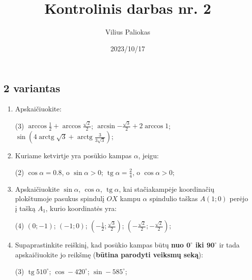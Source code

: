 \documentclass[a4paper]{article}
\title{Kontrolinis darbas nr. 2}
\author{Vilius Paliokas}
\date{2023/10/17}
\DeclareMathOperator{\tg}{tg}
\DeclareMathOperator{\arctg}{arctg}
\begin{document}
\thispagestyle{empty}
\subsection*{2 variantas}

\begin{enumerate}
      \item Apskaičiuokite:

            \begin{tasks}[item-format={\normalfont}, after-item-skip=4mm](3)
                  \task $\arccos{\frac{1}{2}} + \arccos{\frac{\sqrt{2}}{2}} $;
                  \task $\arcsin{-\frac{\sqrt{3}}{2}} + 2\arccos{1} $;
                  \task $\sin({4\arctg{\sqrt{3}} +
                              \arctg{\frac{3}{3\sqrt{3}}}})  $;

            \end{tasks}

      \item Kuriame ketvirtje yra posūkio kampas $\alpha$, jeigu:
            \begin{tasks}[item-format={\normalfont}, after-item-skip=4mm](2)
                  \task $\cos \alpha = 0.8$, o $\sin \alpha > 0$;
                  \task $\tg \alpha = \frac{2}{4}$, o $\cos \alpha > 0$;
            \end{tasks}
      \item Apskaičiuokite $\sin \alpha$, $\cos \alpha$, $\tg \alpha$, kai
            stačiakampėje koordinačių plokštumoje pasukus spindulį $OX$ kampu
            $\alpha$ spindulio taškas $A(1; 0)$ perėjo į tašką $A_{1}$, kurio
            koordinatės
            yra:
            \begin{tasks}[item-format={\normalfont}, after-item-skip=4mm](4)
                  \task $(0; -1)$;
                  \task $(-1; 0)$;
                  \task $(-\frac{1}{2}; \frac{\sqrt{3}}{2})$;
                  \task $(-\frac{\sqrt{2}}{2}; -\frac{\sqrt{2}}{2})$;
            \end{tasks}

      \item Supaprastinkite reiškinį, kad posūkio kampas būtų \textbf{nuo
                  $\boldsymbol{0^\circ}$
                  iki $\boldsymbol{90^\circ}$} ir tada apskaičiuokite jo
            reikšmę
            (\textbf{būtina parodyti veiksmų seką}):
            \begin{tasks}[item-format={\normalfont},
                        after-item-skip=4mm](3)
                  \task $\tg 510^\circ$;
                  \task $\cos -420^\circ$;
                  \task $\sin -585^\circ$;
            \end{tasks}


\end{enumerate}
\end{document}
